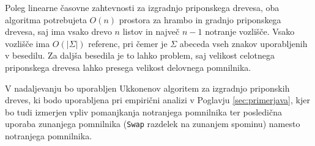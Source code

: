 Poleg linearne časovne zahtevnosti za izgradnjo priponskega drevesa, oba algoritma potrebujeta $O(n)$ prostora za hrambo in gradnjo priponskega drevesa, saj ima vsako drevo $n$ listov in največ $n-1$ notranje vozlišče. Vsako vozlišče ima $O(|\Sigma|)$ referenc, pri čemer je $\Sigma$ abeceda vseh znakov uporabljenih v besedilu. Za daljša besedila je to lahko problem, saj velikost celotnega priponskega drevesa lahko presega velikost delovnega pomnilnika.

V nadaljevanju bo uporabljen Ukkonenov algoritem za izgradnjo priponskih dreves, ki bodo uporabljena pri empirični analizi v Poglavju \ref{sec:primerjava}, kjer bo tudi izmerjen vpliv pomanjkanja notranjega pomnilnika ter posledična uporaba zunanjega pomnilnika (\verb|Swap| razdelek na zunanjem spominu) namesto notranjega pomnilnika.